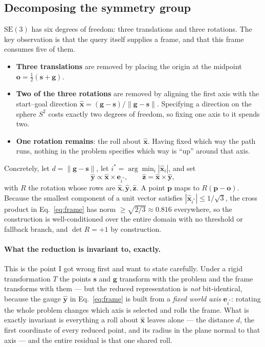 \documentclass[11pt,a4paper]{article}
\newcommand{\xhat}{\hat{\mathbf{x}}}
\newcommand{\yhat}{\hat{\mathbf{y}}}
\newcommand{\zhat}{\hat{\mathbf{z}}}
\newcommand{\svec}{\mathbf{s}}
\newcommand{\gvec}{\mathbf{g}}
\newcommand{\SE}{\mathrm{SE}(3)}
\begin{document}
\subsection{Decomposing the symmetry group}

$\SE$ has six degrees of freedom: three translations and three rotations. The key
observation is that the query itself supplies a frame, and that this frame
consumes five of them.

\begin{itemize}
  \item \textbf{Three translations} are removed by placing the origin at the
  midpoint $\mathbf{o} = \tfrac{1}{2}(\svec + \gvec)$.
  \item \textbf{Two of the three rotations} are removed by aligning the first
  axis with the start--goal direction $\xhat = (\gvec - \svec)/\|\gvec - \svec\|$.
  Specifying a direction on the sphere $S^2$ costs exactly two degrees of
  freedom, so fixing one axis to it spends two.
  \item \textbf{One rotation remains}: the roll about $\xhat$. Having fixed which
  way the path runs, nothing in the problem specifies which way is ``up'' around
  that axis.
\end{itemize}

Concretely, let $d = \|\gvec - \svec\|$, let $i^\ast = \arg\min_i |\xhat_i|$, and
set
\begin{equation}
  \yhat \propto \xhat \times \mathbf{e}_{i^\ast},
  \qquad
  \zhat = \xhat \times \yhat ,
  \label{eq:frame}
\end{equation}
with $R$ the rotation whose rows are $\xhat, \yhat, \zhat$. A point $\mathbf{p}$
maps to $R(\mathbf{p} - \mathbf{o})$. Because the smallest component of a unit
vector satisfies $|\xhat_{i^\ast}| \le 1/\sqrt{3}$, the cross product in
Eq.~\eqref{eq:frame} has norm $\ge \sqrt{2/3} \approx 0.816$ everywhere, so the
construction is well-conditioned over the entire domain with no threshold or
fallback branch, and $\det R = +1$ by construction.

\paragraph{What the reduction is invariant to, exactly.} This is the point I got
wrong first and want to state carefully. Under a rigid transformation $T$ the
points $\svec$ and $\gvec$ transform with the problem and the frame transforms
with them --- but the reduced representation is \emph{not} bit-identical, because
the gauge $\yhat$ in Eq.~\eqref{eq:frame} is built from a \emph{fixed world axis}
$\mathbf{e}_{i^\ast}$: rotating the whole problem changes which axis is selected
and rolls the frame. What is exactly invariant is everything a roll about $\xhat$
leaves alone --- the distance $d$, the first coordinate of every reduced point,
and its radius in the plane normal to that axis --- and the entire residual is
that one shared roll.
\end{document}
